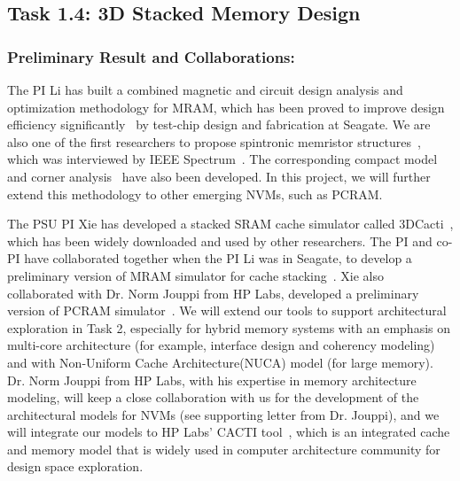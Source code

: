 \subsection{Task 1.4: 3D Stacked Memory Design}

\subsubsection{Preliminary Result and Collaborations:}
The PI Li has built a combined magnetic and circuit design analysis and optimization methodology for MRAM, which has been proved to improve design efficiency significantly~\cite{Chen08} by test-chip design and fabrication at Seagate. We are also one of the first researchers to propose spintronic memristor structures~\cite{Wang09}, which was interviewed by IEEE Spectrum~\cite{Spectrum09}. The corresponding compact model and corner analysis~\cite{Chen09} have also been developed. In this project, we will further extend this methodology to other emerging NVMs, such as PCRAM.

The PSU PI Xie has developed a stacked SRAM cache
simulator called 3DCacti~\cite{xie:iccd05-3d, XIE:TVLSI2008-3DCacti},
which has been widely downloaded and used by other researchers.
The PI and co-PI have collaborated together when the PI Li was in Seagate,
to develop a preliminary version of MRAM simulator for cache stacking~\cite{MRAM:DONG08,XIE:HPCA09}.
Xie also collaborated with Dr. Norm Jouppi
from HP Labs, developed a preliminary version of PCRAM simulator~\cite{xie:pcramsim}.
We will extend our tools to support architectural exploration in Task 2, especially
for hybrid memory systems with an emphasis on multi-core architecture
(for example, interface design and coherency modeling)
and with Non-Uniform Cache Architecture(NUCA) model (for large
memory). Dr. Norm Jouppi from HP Labs,
with his expertise in memory architecture modeling, will keep a close
collaboration with us for the development of the architectural models for NVMs (see supporting letter
from Dr. Jouppi), and we will integrate our models to HP Labs' CACTI tool~\cite{CACTI}, which is an integrated cache and memory model that is widely used in computer architecture community for design space exploration.


